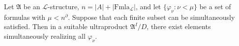 Let $\mathfrak{A}$ be an $\mathcal{L}$-structure, $n = |A| + |\text{Fmla}_\mathcal{L}|$, and let $\{\varphi_\nu : \nu < \mu\}$ be a set of formulas with $\mu < n^\partial$. Suppose that each finite subset can be simultaneously satisfied. Then in a suitable ultraproduct $\mathfrak{A}^I/D$, there exist elements simultaneously realizing all $\varphi_\nu$.
